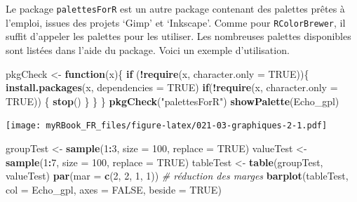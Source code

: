\documentclass[
]{book}
\newenvironment{Shaded}{\begin{snugshade}}{\end{snugshade}}
\newcommand{\CommentTok}[1]{\textcolor[rgb]{0.56,0.35,0.01}{\textit{#1}}}
\newcommand{\ControlFlowTok}[1]{\textcolor[rgb]{0.13,0.29,0.53}{\textbf{#1}}}
\newcommand{\DataTypeTok}[1]{\textcolor[rgb]{0.13,0.29,0.53}{#1}}
\newcommand{\DecValTok}[1]{\textcolor[rgb]{0.00,0.00,0.81}{#1}}
\newcommand{\KeywordTok}[1]{\textcolor[rgb]{0.13,0.29,0.53}{\textbf{#1}}}
\newcommand{\NormalTok}[1]{#1}
\newcommand{\OperatorTok}[1]{\textcolor[rgb]{0.81,0.36,0.00}{\textbf{#1}}}
\newcommand{\OtherTok}[1]{\textcolor[rgb]{0.56,0.35,0.01}{#1}}
\newcommand{\StringTok}[1]{\textcolor[rgb]{0.31,0.60,0.02}{#1}}
\begin{document}
Le package \texttt{palettesForR} est un autre package contenant des palettes prêtes à l'emploi, issues des projets `Gimp' et `Inkscape'. Comme pour \texttt{RColorBrewer}, il suffit d'appeler les palettes pour les utiliser. Les nombreuses palettes disponibles sont listées dans l'aide du package. Voici un exemple d'utilisation.

\begin{Shaded}
\begin{Highlighting}[]
\NormalTok{pkgCheck <-}\StringTok{ }\ControlFlowTok{function}\NormalTok{(x)\{ }
    \ControlFlowTok{if}\NormalTok{ (}\OperatorTok{!}\KeywordTok{require}\NormalTok{(x, }\DataTypeTok{character.only =} \OtherTok{TRUE}\NormalTok{))\{}
        \KeywordTok{install.packages}\NormalTok{(x, }\DataTypeTok{dependencies =} \OtherTok{TRUE}\NormalTok{)}
        \ControlFlowTok{if}\NormalTok{(}\OperatorTok{!}\KeywordTok{require}\NormalTok{(x, }\DataTypeTok{character.only =} \OtherTok{TRUE}\NormalTok{)) \{}
            \KeywordTok{stop}\NormalTok{()}
\NormalTok{        \}}
\NormalTok{    \}}
\NormalTok{\}}
\KeywordTok{pkgCheck}\NormalTok{(}\StringTok{"palettesForR"}\NormalTok{)}
\KeywordTok{showPalette}\NormalTok{(Echo_gpl)}
\end{Highlighting}
\end{Shaded}

\texttt{[image: myRBook\_FR\_files/figure-latex/021-03-graphiques-2-1.pdf]}

\begin{Shaded}
\begin{Highlighting}[]
\NormalTok{groupTest <-}\StringTok{ }\KeywordTok{sample}\NormalTok{(}\DecValTok{1}\OperatorTok{:}\DecValTok{3}\NormalTok{, }\DataTypeTok{size =} \DecValTok{100}\NormalTok{, }\DataTypeTok{replace =} \OtherTok{TRUE}\NormalTok{) }
\NormalTok{valueTest <-}\StringTok{ }\KeywordTok{sample}\NormalTok{(}\DecValTok{1}\OperatorTok{:}\DecValTok{7}\NormalTok{, }\DataTypeTok{size =} \DecValTok{100}\NormalTok{, }\DataTypeTok{replace =} \OtherTok{TRUE}\NormalTok{)}
\NormalTok{tableTest <-}\StringTok{ }\KeywordTok{table}\NormalTok{(groupTest, valueTest)}
\KeywordTok{par}\NormalTok{(}\DataTypeTok{mar =} \KeywordTok{c}\NormalTok{(}\DecValTok{2}\NormalTok{, }\DecValTok{2}\NormalTok{, }\DecValTok{1}\NormalTok{, }\DecValTok{1}\NormalTok{)) }\CommentTok{# réduction des marges}
\KeywordTok{barplot}\NormalTok{(tableTest, }
  \DataTypeTok{col =}\NormalTok{ Echo_gpl, }\DataTypeTok{axes =} \OtherTok{FALSE}\NormalTok{, }\DataTypeTok{beside =} \OtherTok{TRUE}\NormalTok{)}
\end{Highlighting}
\end{Shaded}
\end{document}
